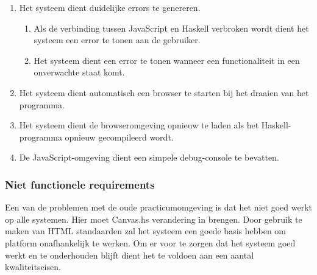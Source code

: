 \begin{enumerate}[label={R\arabic*}]
\setcounter{enumi}{\value{startvalue}}
	\item \label{req:errors} Het systeem dient duidelijke errors te genereren.
	\begin{enumerate}[label={R\arabic{enumi}.\arabic*}]
		\item Als de verbinding tussen JavaScript en Haskell verbroken wordt dient het systeem een error te tonen aan de gebruiker. 
		\item Het systeem dient een error te tonen wanneer een functionaliteit in een onverwachte staat komt.
	\end{enumerate}
	\item \label{req:launchbrowser} Het systeem dient automatisch een browser te starten bij het draaien van het programma.
	\item \label{req:reload} Het systeem dient de browseromgeving opnieuw te laden als het Haskell-programma opnieuw gecompileerd wordt.
	\item \label{req:debug} De JavaScript-omgeving dient een simpele debug-console te bevatten.
	\setcounter{startvalue}{\value{enumi}}
\end{enumerate}

\subsubsection{Niet functionele requirements}
Een van de problemen met de oude practicumomgeving is dat het niet goed werkt op alle systemen. Hier moet Canvas.hs verandering in brengen. Door gebruik te maken van HTML standaarden zal het systeem een goede basis hebben om platform onafhankelijk te werken. Om er voor te zorgen dat het systeem goed werkt en te onderhouden blijft dient het te voldoen aan een aantal kwaliteitseisen.

